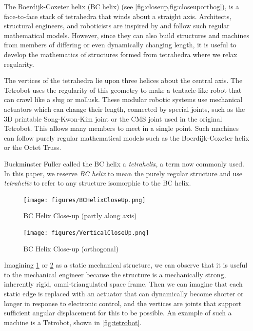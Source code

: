 \documentclass[twocolumn,10pt]{asme2ej}
\begin{document}
The Boerdijk-Coxeter helix\cite{coxeter1985simplicial} (BC helix) (see \cref{fig:closeup,fig:closeuporthog}), is
a face-to-face stack of tetrahedra that winds about a straight axis.
Architects, structural engineers, and roboticists are inspired
by and follow such regular mathematical models.
However, since they can also build structures and
machines from members of differing or even dynamically changing length, it is
useful to develop the mathematics of structures formed from tetrahedra
where we relax regularity.


The vertices of the tetrahedra lie upon
three helices about the central axis.
The 
Tetrobot\cite{readglussbot,TetrobotBook} uses the regularity of
this geometry to make a tentacle-like robot that can crawl like a slug
or mollusk.  These modular robotic systems use mechanical actuators which can
change their length, connected by special joints,
such as the 3D printable Song-Kwon-Kim\cite{song2003spherical} joint or the CMS joint\cite{HamlinSandersonCMS}
used in the original Tetrobot.
This allows many members to meet in a single point.
Such machines can
follow purely regular mathematical models such as the Boerdijk-Coxeter
helix or the Octet Truss\cite{richard1961synergetic}.

Buckminster Fuller called the BC helix a \emph{tetrahelix}\cite{fuller1982synergetics},
a term now commonly used. In this paper, we reserve \emph{BC helix} to mean the purely
regular structure and use \emph{tetrahelix} to refer
to any structure isomorphic to the BC helix.

\begin{figure}
  \centering
     \texttt{[image: figures/BCHelixCloseUp.png]}
     \caption{BC Helix Close-up (partly along axis)}
  \label{fig:closeup}     
\end{figure}
\begin{figure}
  \centering
     \texttt{[image: figures/VerticalCloseUp.png]}
     \caption{BC Helix Close-up (orthogonal)}
  \label{fig:closeuporthog}
\end{figure}

Imagining \cref{fig:closeup} or \cref{fig:closeuporthog} as a static mechanical structure,
we can observe that it is useful to the mechanical engineer
because the structure is a mechanically strong, inherently rigid,
omni-triangulated space frame.
Then we can imagine that each static edge is replaced with an
actuator that can dynamically become shorter or longer in response to electronic control,
and the vertices are joints that support sufficient angular displacement
for this to be possible. An example of such a machine is a Tetrobot,
shown in \cref{fig:tetrobot}.
\end{document}
